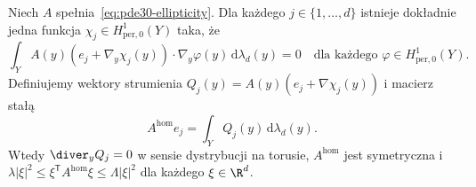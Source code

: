 \begin{twierdzenie}\label{thm:pde30-cell}
Niech $A$ spełnia~\eqref{eq:pde30-ellipticity}.
Dla każdego $j\in\{1,\ldots,d\}$ istnieje dokładnie jedna
funkcja $\chi_j\in H^1_{\mathrm{per},0}(Y)$ taka, że
\begin{equation}\label{eq:pde30-cell}
\int_Y A(y)(e_j+\nabla_y\chi_j(y))\cdot\nabla_y\varphi(y)
\,\mathrm d\lambda_d(y)=0
\quad\text{dla każdego }\varphi\in H^1_{\mathrm{per},0}(Y).
\end{equation}
Definiujemy wektory strumienia $Q_j(y)=A(y)(e_j+\nabla\chi_j(y))$
i macierz stałą
\begin{equation}\label{eq:pde30-ahom}
 A^{\mathrm{hom}}e_j=\int_YQ_j(y)\,\mathrm d\lambda_d(y).
\end{equation}
Wtedy $\diver_yQ_j=0$ w sensie dystrybucji na torusie,
$A^{\mathrm{hom}}$ jest symetryczna i
$\lambda|\xi|^2\le\xi^{\mathsf T}A^{\mathrm{hom}}\xi
\le\Lambda|\xi|^2$ dla każdego $\xi\in\R^d$.
\end{twierdzenie}
